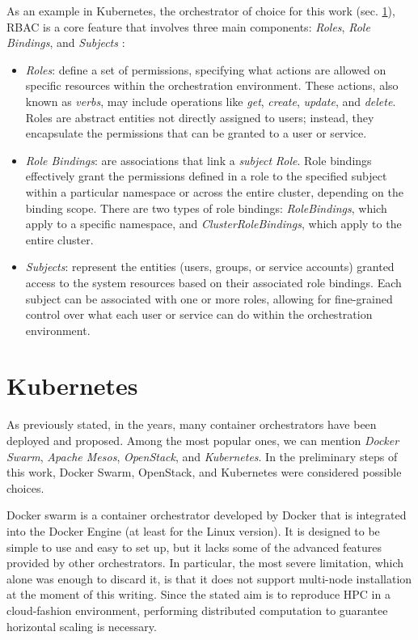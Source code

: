 As an example in Kubernetes, the orchestrator of choice for this work (sec.
\ref{sec:chpt1-kubernetes}), RBAC is a core feature that involves three main
components: \textit{Roles}, \textit{Role Bindings}, and \textit{Subjects}
\cite{kdoc-rbac}:

\begin{itemize}
  \itemsep0em
   \item \textit{Roles}: define a set of permissions, specifying what actions
     are allowed on specific resources within the orchestration environment.
     These actions, also known as \textit{verbs}, may include operations like
     \textit{get},  \textit{create}, \textit{update}, and \textit{delete}.
     Roles are abstract entities not directly assigned to users; instead, they
     encapsulate the permissions that can be granted to a user or service.
   \item \textit{Role Bindings}: are associations that link a \textit{subject}
     \textit{Role}.
     Role bindings effectively grant the permissions defined in a role to the
     specified subject within a particular namespace or across the entire
     cluster, depending on the binding scope.
     There are two types of role bindings: \textit{RoleBindings}, which apply to
     a specific namespace, and \textit{ClusterRoleBindings}, which apply to the
     entire cluster.
   \item \textit{Subjects}: represent the entities (users, groups, or service
     accounts) granted access to the system resources based on their associated
     role bindings. Each subject can be associated with one or more roles,
     allowing for fine-grained control over what each user or service can do
     within the orchestration environment.
\end{itemize}

\section{Kubernetes}\label{sec:chpt1-kubernetes}

As previously stated, in the years, many container orchestrators have been
deployed and proposed.
Among the most popular ones, we can mention \textit{Docker Swarm},
\textit{Apache Mesos}, \textit{OpenStack}, and \textit{Kubernetes}.
In the preliminary steps of this work, Docker Swarm, OpenStack, and Kubernetes
were considered possible choices.

Docker swarm \cite{Singh2023} is a container orchestrator developed by Docker
that is integrated into the Docker Engine (at least for the Linux version).  It
is designed to be simple to use and easy to set up, but it lacks some of the
advanced features provided by other orchestrators.  In particular, the most
severe limitation, which alone was enough to discard it, is that it does not
support multi-node installation at the moment of this writing. Since the stated
aim is to reproduce HPC in a cloud-fashion environment, performing distributed
computation to guarantee horizontal scaling is necessary.

